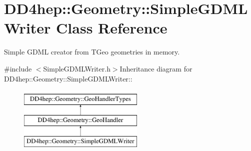 \hypertarget{class_d_d4hep_1_1_geometry_1_1_simple_g_d_m_l_writer}{
\section{DD4hep::Geometry::SimpleGDMLWriter Class Reference}
\label{class_d_d4hep_1_1_geometry_1_1_simple_g_d_m_l_writer}
}


Simple GDML creator from TGeo geometries in memory.  


{\ttfamily \#include $<$SimpleGDMLWriter.h$>$}Inheritance diagram for DD4hep::Geometry::SimpleGDMLWriter::\begin{figure}[H]
\begin{center}
\leavevmode
\includegraphics[height=3cm]{class_d_d4hep_1_1_geometry_1_1_simple_g_d_m_l_writer}
\end{center}
\end{figure}
